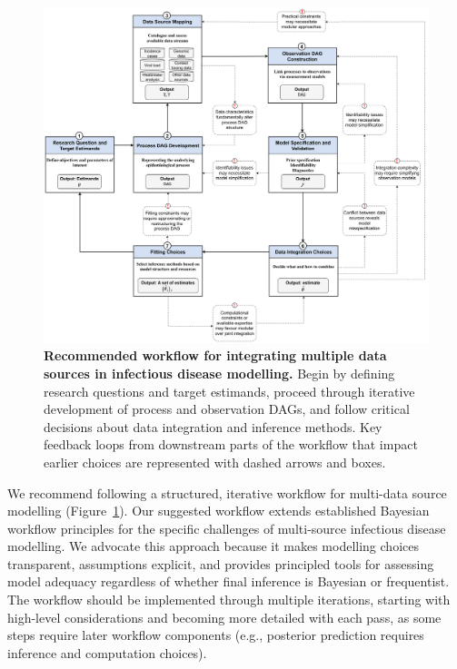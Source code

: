 \documentclass{article}
\begin{document}
\begin{figure}[htbp]
    \centering
    \includegraphics[width=\textwidth]{figures/core steps with more details.drawio.pdf}
    \caption{\textbf{Recommended workflow for integrating multiple data sources in infectious disease modelling.} Begin by defining research questions and target estimands, proceed through iterative development of process and observation DAGs, and follow critical decisions about data integration and inference methods. Key feedback loops from downstream parts of the workflow that impact earlier choices are represented with dashed arrows and boxes.}
    \label{fig:workflow}
\end{figure}

We recommend following a structured, iterative workflow for multi-data source modelling (Figure~\ref{fig:workflow}). Our suggested workflow extends established Bayesian workflow principles \citep{gelman2020bayesian} for  the specific challenges of multi-source infectious disease modelling.
We advocate this approach because it makes modelling choices transparent, assumptions explicit, and provides principled tools for assessing model adequacy regardless of whether final inference is Bayesian or frequentist.
The workflow should be implemented through multiple iterations, starting with high-level considerations and becoming more detailed with each pass, as some steps require later workflow components (e.g., posterior prediction requires inference and computation choices).
\end{document}

